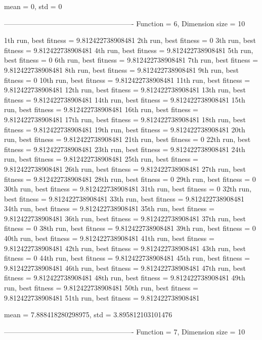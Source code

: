 mean = 0, std = 0

-------------------------------------------------------
Function = 6, Dimension size = 10

1th run, best fitness = 9.812422738908481
2th run, best fitness = 0
3th run, best fitness = 9.812422738908481
4th run, best fitness = 9.812422738908481
5th run, best fitness = 0
6th run, best fitness = 9.812422738908481
7th run, best fitness = 9.812422738908481
8th run, best fitness = 9.812422738908481
9th run, best fitness = 0
10th run, best fitness = 9.812422738908481
11th run, best fitness = 9.812422738908481
12th run, best fitness = 9.812422738908481
13th run, best fitness = 9.812422738908481
14th run, best fitness = 9.812422738908481
15th run, best fitness = 9.812422738908481
16th run, best fitness = 9.812422738908481
17th run, best fitness = 9.812422738908481
18th run, best fitness = 9.812422738908481
19th run, best fitness = 9.812422738908481
20th run, best fitness = 9.812422738908481
21th run, best fitness = 0
22th run, best fitness = 9.812422738908481
23th run, best fitness = 9.812422738908481
24th run, best fitness = 9.812422738908481
25th run, best fitness = 9.812422738908481
26th run, best fitness = 9.812422738908481
27th run, best fitness = 9.812422738908481
28th run, best fitness = 0
29th run, best fitness = 0
30th run, best fitness = 9.812422738908481
31th run, best fitness = 0
32th run, best fitness = 9.812422738908481
33th run, best fitness = 9.812422738908481
34th run, best fitness = 9.812422738908481
35th run, best fitness = 9.812422738908481
36th run, best fitness = 9.812422738908481
37th run, best fitness = 0
38th run, best fitness = 9.812422738908481
39th run, best fitness = 0
40th run, best fitness = 9.812422738908481
41th run, best fitness = 9.812422738908481
42th run, best fitness = 9.812422738908481
43th run, best fitness = 0
44th run, best fitness = 9.812422738908481
45th run, best fitness = 9.812422738908481
46th run, best fitness = 9.812422738908481
47th run, best fitness = 9.812422738908481
48th run, best fitness = 9.812422738908481
49th run, best fitness = 9.812422738908481
50th run, best fitness = 9.812422738908481
51th run, best fitness = 9.812422738908481

mean = 7.888418280298975, std = 3.895812103101476

-------------------------------------------------------
Function = 7, Dimension size = 10

